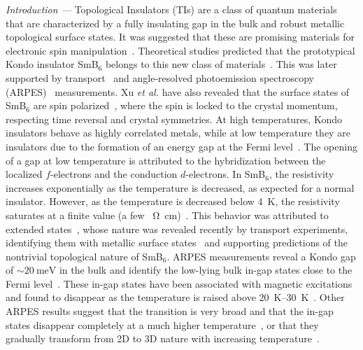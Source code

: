 \documentclass[10pt,aps,prb,twocolumn,showpacs,preprintnumbers,amsmath,amssymb,superscriptaddress,floatfix]{revtex4-1}
\newcommand{\smb}{SmB$_6$}
\newcommand{\etal}{\emph{et al.}}
\newcommand{\usim}{\sim \!}
\newcommand{\mysection}[1]{\smallskip\emph{#1 ---}\phantomsection}
\begin{document}
\maketitle

\mysection{Introduction}
%
Topological Insulators (TIs) are a class of quantum materials that are
characterized by a fully insulating gap in the bulk and robust
metallic topological surface states. It was suggested that these are
promising materials for electronic spin
manipulation~\cite{Moore2010n}. Theoretical studies predicted that the
prototypical Kondo insulator \smb{} belongs to this new class of
materials~\cite{Dzero2010prl,Alexandrov2013prl,Lu2013prl,Dzero2012prb}. This
was later supported by
transport~\cite{Wolgast2013prb,Kim2013sr,Zhang2013prx,Kim2014nm} and
angle-resolved photoemission spectroscopy
(ARPES)~\cite{Xu2013prb,Neupane2013nc,Jiang2013nc} measurements.  Xu
\etal{} have also revealed that the surface states of \smb{} are spin
polarized~\cite{Xu2014nc}, where the spin is locked to the crystal
momentum, respecting time reversal and crystal symmetries. At high
temperatures, Kondo insulators behave as highly correlated metals,
while at low temperature they are insulators due to the formation of
an energy gap at the Fermi
level~\cite{Aeppli1992ccmp,Riseborough2000adp,Coleman2007}.  The
opening of a gap at low temperature is attributed to the hybridization
between the localized $f$-electrons and the conduction
$d$-electrons. In \smb{}, the resistivity increases exponentially as
the temperature is decreased, as expected for a normal
insulator. However, as the temperature is decreased below \SI{4}{\K},
the resistivity saturates at a finite value (a few \SI{}{\ohm
  \cm})~\cite{Menth1969prl,Allen1979PRB}. This behavior was attributed
to extended states~\cite{Cooley1995prl}, whose nature was
revealed recently by transport experiments, identifying them with
metallic surface
states~\cite{Wolgast2013prb,Kim2013sr,Zhang2013prx,Kim2014nm} and
supporting predictions of the nontrivial topological nature of \smb.
ARPES measurements reveal a Kondo gap of $\usim\SI{20}{\meV}$ in the
bulk and identify the low-lying bulk in-gap states close to the Fermi
level~\cite{Xu2013prb,Neupane2013nc,Jiang2013nc,Miyazaki2012prb,Denlinger2000pb}. These
in-gap states have been associated with magnetic
excitations~\cite{Alekseev1993pb,Riseborough2000adp,Miyazaki2012prb}
and found to disappear as the temperature is raised above
\SIrange{20}{30}{\K}~\cite{Alekseev1993pb,Neupane2013nc}. Other ARPES
results suggest that the transition is very broad and that the in-gap
states disappear completely at a much higher
temperature~\cite{Xu2013prb}, or that they gradually transform from 2D
to 3D nature with increasing
temperature~\cite{Denlinger2014jpscs,Denlinger2013arxiv}.
\end{document}

